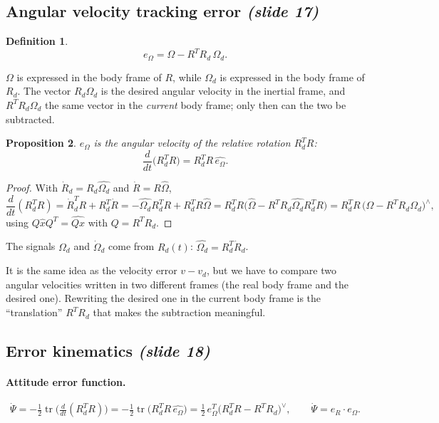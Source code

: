 \documentclass[11pt,a4paper]{article}
\newcommand{\tr}{\operatorname{tr}}
\newcommand{\hatm}[1]{\widehat{#1}}          %
\newcommand{\VEE}{^{\vee}}
\newcommand{\eR}{e_R}
\newcommand{\eO}{e_\Omega}
\newcommand{\Od}{\Omega_d}
\newcommand{\sli}[1]{\emph{(#1)}}
\theoremstyle{definition}
\newtheorem{definition}{Definition}[section]
\theoremstyle{plain}
\newtheorem{proposition}[definition]{Proposition}
\theoremstyle{remark}
\begin{document}
\subsection{Angular velocity tracking error \sli{slide 17}}

\begin{definition}
\[
\eO=\Omega-R^TR_d\,\Od .
\]
\end{definition}

$\Omega$ is expressed in the body frame of $R$, while $\Od$ is expressed in the body frame of $R_d$. The vector $R_d\Od$ is the desired angular velocity in the inertial frame, and $R^TR_d\Od$ the same vector in the \emph{current} body frame; only then can the two be subtracted.

\begin{proposition}
$\eO$ is the angular velocity of the relative rotation $R_d^TR$:
\[
\frac{d}{dt}\big(R_d^TR\big)=R_d^TR\,\hatm{\eO}.
\]
\end{proposition}
\begin{proof}
With $\dot R_d=R_d\hatm\Od$ and $\dot R=R\hatm\Omega$,
\[
\frac d{dt}(R_d^TR)=\dot R_d^TR+R_d^T\dot R=-\hatm\Od R_d^TR+R_d^TR\hatm\Omega
=R_d^TR\big(\hatm\Omega-R^TR_d\hatm\Od R_d^TR\big)=R_d^TR\,\big(\Omega-R^TR_d\Od\big)^\wedge ,
\]
using $Q\hatm xQ^T=\widehat{Qx}$ with $Q=R^TR_d$.
\end{proof}

The signals $\Od$ and $\dot\Omega_d$ come from $R_d(t)$: $\hatm\Od=R_d^T\dot R_d$.

\begin{intuition}
It is the same idea as the velocity error $v-v_d$, but we have to compare two angular velocities written in two different frames (the real body frame and the desired one). Rewriting the desired one in the current body frame is the ``translation'' $R^TR_d$ that makes the subtraction meaningful.
\end{intuition}

\subsection{Error kinematics \sli{slide 18}}

\paragraph{Attitude error function.} 
\[
\dot\Psi=-\tfrac12\tr\!\Big(\tfrac d{dt}(R_d^TR)\Big)=-\tfrac12\tr\big(R_d^TR\,\hatm{\eO}\big)=\tfrac12\,\eO^T\big(R_d^TR-R^TR_d\big)\VEE,
\qquad\boxed{\dot\Psi=\eR\cdot\eO}.
\]
\end{document}
